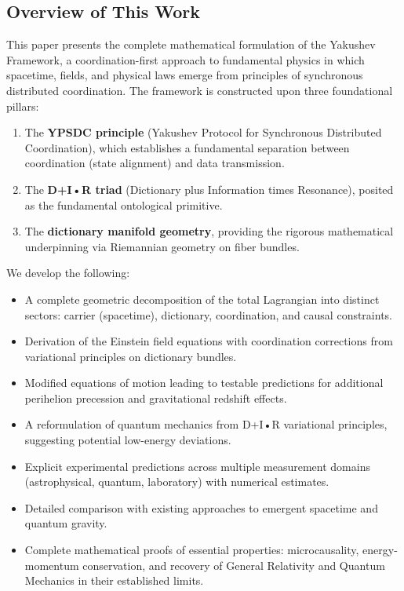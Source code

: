 \documentclass[11pt,a4paper]{article}
\begin{document}
\subsection{Overview of This Work}
This paper presents the complete mathematical formulation of the Yakushev Framework, a coordination-first approach to fundamental physics in which spacetime, fields, and physical laws emerge from principles of synchronous distributed coordination. The framework is constructed upon three foundational pillars:
\begin{enumerate}
	\item The \textbf{YPSDC principle} (Yakushev Protocol for Synchronous Distributed Coordination), which establishes a fundamental separation between coordination (state alignment) and data transmission.
	\item The \textbf{D+I•R triad} (Dictionary plus Information times Resonance), posited as the fundamental ontological primitive.
	\item The \textbf{dictionary manifold geometry}, providing the rigorous mathematical underpinning via Riemannian geometry on fiber bundles.
\end{enumerate}

We develop the following:
\begin{itemize}
	\item A complete geometric decomposition of the total Lagrangian into distinct sectors: carrier (spacetime), dictionary, coordination, and causal constraints.
	\item Derivation of the Einstein field equations with coordination corrections from variational principles on dictionary bundles.
	\item Modified equations of motion leading to testable predictions for additional perihelion precession and gravitational redshift effects.
	\item A reformulation of quantum mechanics from D+I•R variational principles, suggesting potential low-energy deviations.
	\item Explicit experimental predictions across multiple measurement domains (astrophysical, quantum, laboratory) with numerical estimates.
	\item Detailed comparison with existing approaches to emergent spacetime and quantum gravity.
	\item Complete mathematical proofs of essential properties: microcausality, energy-momentum conservation, and recovery of General Relativity and Quantum Mechanics in their established limits.
\end{itemize}
\end{document}
